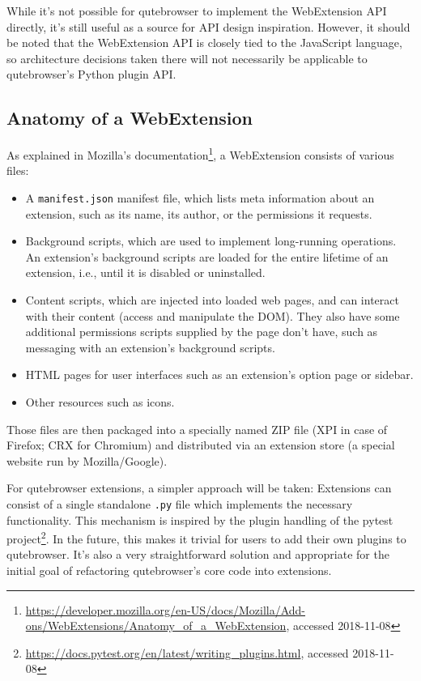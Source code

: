 \documentclass[a4paper,parskip=full]{scrreprt}
\begin{document}
While it's not possible for qutebrowser to implement the WebExtension API
directly, it's still useful as a source for API design inspiration. However, it
should be noted that the WebExtension API is closely tied to the JavaScript
language, so architecture decisions taken there will not necessarily be
applicable to qutebrowser's Python plugin API.

\subsection{Anatomy of a WebExtension}
\label{anatomy}

As explained in Mozilla's
documentation\footnote{\url{https://developer.mozilla.org/en-US/docs/Mozilla/Add-ons/WebExtensions/Anatomy_of_a_WebExtension},
  accessed 2018-11-08},
a WebExtension consists of various files:

\begin{itemize}
  \item A \verb|manifest.json| manifest file, which lists meta information about
    an extension, such as its name, its author, or the permissions it requests.
  \item Background scripts, which are used to implement long-running operations.
    An extension's background scripts are loaded for the entire lifetime of an
    extension, i.e., until it is disabled or uninstalled.
  \item Content scripts, which are injected into loaded web pages, and can
    interact with their content (access and manipulate the DOM). They also have
    some additional permissions scripts supplied by the page don't have, such as
    messaging with an extension's background scripts.
  \item HTML pages for user interfaces such as an extension's option page or sidebar.
  \item Other resources such as icons.
\end{itemize}

Those files are then packaged into a specially named ZIP file (XPI in case of
Firefox; CRX for Chromium) and distributed via an extension store (a special
website run by Mozilla/Google).

For qutebrowser extensions, a simpler approach will be taken: Extensions can
consist of a single standalone \verb|.py| file which implements the necessary
functionality. This mechanism is inspired by the plugin handling of the pytest
project\footnote{\url{https://docs.pytest.org/en/latest/writing_plugins.html},
  accessed 2018-11-08}. In the future, this makes it trivial for users to add
their own plugins to qutebrowser. It's also a very straightforward solution and
appropriate for the initial goal of refactoring qutebrowser's core code into
extensions.
\end{document}
